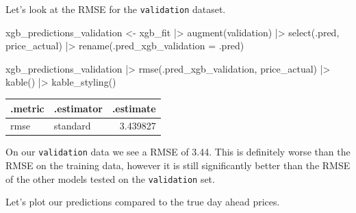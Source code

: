\documentclass[
]{article}
\newenvironment{Shaded}{\begin{snugshade}}{\end{snugshade}}
\newcommand{\AttributeTok}[1]{\textcolor[rgb]{0.40,0.45,0.13}{#1}}
\newcommand{\FunctionTok}[1]{\textcolor[rgb]{0.28,0.35,0.67}{#1}}
\newcommand{\NormalTok}[1]{\textcolor[rgb]{0.00,0.23,0.31}{#1}}
\newcommand{\OtherTok}[1]{\textcolor[rgb]{0.00,0.23,0.31}{#1}}
\newcommand{\SpecialCharTok}[1]{\textcolor[rgb]{0.37,0.37,0.37}{#1}}
\begin{document}
Let's look at the RMSE for the \texttt{validation} dataset.

\begin{Shaded}
\begin{Highlighting}[]
\NormalTok{xgb\_predictions\_validation }\OtherTok{\textless{}{-}}\NormalTok{ xgb\_fit }\SpecialCharTok{|\textgreater{}}
  \FunctionTok{augment}\NormalTok{(validation) }\SpecialCharTok{|\textgreater{}}
  \FunctionTok{select}\NormalTok{(.pred, price\_actual) }\SpecialCharTok{|\textgreater{}}
  \FunctionTok{rename}\NormalTok{(}\AttributeTok{.pred\_xgb\_validation =}\NormalTok{ .pred)}

\NormalTok{xgb\_predictions\_validation }\SpecialCharTok{|\textgreater{}}
  \FunctionTok{rmse}\NormalTok{(.pred\_xgb\_validation, price\_actual) }\SpecialCharTok{|\textgreater{}}
  \FunctionTok{kable}\NormalTok{() }\SpecialCharTok{|\textgreater{}}
  \FunctionTok{kable\_styling}\NormalTok{()}
\end{Highlighting}
\end{Shaded}

\begin{longtable*}[t]{llr}
\toprule
.metric & .estimator & .estimate\\
\midrule
rmse & standard & 3.439827\\
\bottomrule
\end{longtable*}

On our \texttt{validation} data we see a RMSE of 3.44. This is
definitely worse than the RMSE on the training data, however it is still
significantly better than the RMSE of the other models tested on the
\texttt{validation} set.

Let's plot our predictions compared to the true day ahead prices.
\end{document}
